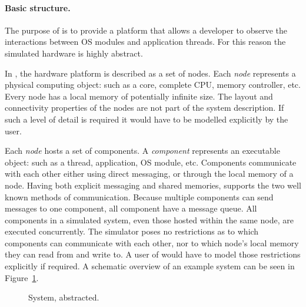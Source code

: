 \paragraph{Basic structure.} 
The purpose of \soosim is to provide a platform that allows a developer to observe the interactions between OS modules and application threads.
For this reason the simulated hardware is highly abstract.

In \soosim, the hardware platform is described as a set of nodes.
Each \emph{node} represents a physical computing object: such as a core, complete CPU, memory controller, etc.
Every node has a local memory of potentially infinite size.
The layout and connectivity properties of the nodes are not part of the system description.
If such a level of detail is required it would have to be modelled explicitly by the user.

Each \emph{node} hosts a set of components.
A \emph{component} represents an executable object: such as a thread, application, OS module, etc.
Components communicate with each other either using direct messaging, or through the local memory of a node.
Having both explicit messaging and shared memories, \soosim supports the two well known methods of communication.
Because multiple components can send messages to one component, all component have a message queue.
All components in a simulated system, even those hosted within the same node, are executed concurrently.
The simulator poses no restrictions as to which components can communicate with each other, nor to which node's local memory they can read from and write to.
A user of \soosim would have to model those restrictions explicitly if required.
A schematic overview of an example system can be seen in Figure~\ref{fig:system}.

\def\svgwidth{\columnwidth}
\begin{figure}
%
\caption{System, abstracted.}
\label{fig:system}
\end{figure}

